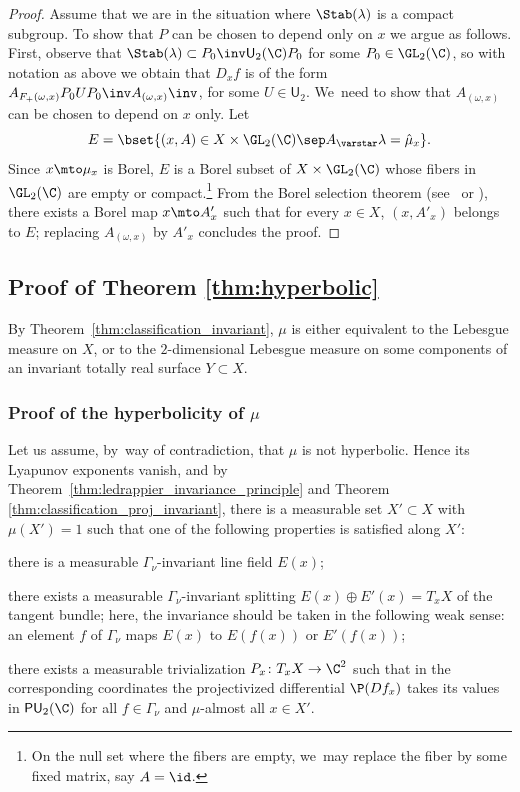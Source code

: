 \begin{proof}
Assume that we are in the situation where $\Stab(\lambda)$ is a compact subgroup.
To show that $P$ can be chosen to depend only on $x$ we argue as follows. First, observe that
$\Stab(\lambda) \subset P_0\inv \mathsf{U}_2(\C)P_0 $ for some $P_0\in \GL_2(\C)$, so with notation as above we obtain that $D_xf$ is of the form
$A_{F_+(\omega, x)} P_0 U P_0\inv A_{(\omega, x)}\inv$, for some $U\in \mathsf{U}_2$. We~need to show that $A_{(\omega, x)}$ can be chosen to depend on $x$ only.
Let
\begin{equation*}
E = \bset{(x, A)\in X\times \GL_2(\C)\sep  A_\varstar \lambda = \hat \mu_x}.
\end{equation*} Since
$x\mto \mu_x$ is Borel, $E$ is a Borel subset
of $X\times \GL_2(\C)$ whose fibers in $\GL_2(\C)$ are empty or compact.\footnote{On the null set where the fibers are empty, we~may replace the fiber by some fixed matrix, say $A=\id$.}
From the Borel selection theorem (see~\cite[Th.\,6.9.6]{bogachev_book} or \hbox{\cite[App.\,A]{Zimmer:book}}), there exists a Borel map $x\mto A'_x$ such that for every $x\in X$, $(x, A'_x)$ belongs to $E$; replacing
$A_{(\omega, x)}$ by $A'_x$ concludes the proof.
\end{proof}

\subsection{Proof of Theorem \ref{thm:hyperbolic}}\label{subs:proof_hyperbolic}
By Theorem~\ref{thm:classification_invariant},
$\mu$ is either equivalent to the Lebesgue measure on $X$, or to the $2$-dimensional Lebesgue measure on some components of an invariant totally real surface $Y\subset X$.

\subsubsection{Proof of the hyperbolicity of $\mu$}\label{subsubsec:721}
Let us assume, by~way of contradiction, that $\mu$ is not hyperbolic. Hence its Lyapunov exponents vanish,
and by Theorem~\ref{thm:ledrappier_invariance_principle} and Theorem \ref{thm:classification_proj_invariant}, there
is a measurable set $X'\subset X$
with $\mu(X') = 1$ such that one of the following properties is satisfied along $X'$: \label{alternative_abc}
\begin{enumeratea}
\item\label{case:a} there is a measurable $\Gamma_\nu$-invariant line field $E(x)$;
\item\label{case:b} there exists a measurable $\Gamma_\nu$-invariant splitting $E(x)\oplus E'(x)=T_xX$ of the tangent bundle;
here, the invariance should be taken in the following weak sense: an element $f$ of $\Gamma_\nu$ maps $E(x)$ to
$E(f(x))$ or $E'(f(x))$;
\item\label{case:c} there exists a measurable trivialization $P_x\colon T_xX\to \C^2$ such that in the corresponding coordinates
the projectivized
differential $\P(Df_x)$ takes its values in $\mathsf {PU}_2(\C)$ for all $f\in \Gamma_\nu$ and $\mu$-almost all $x\in X'$.
\end{enumeratea}

